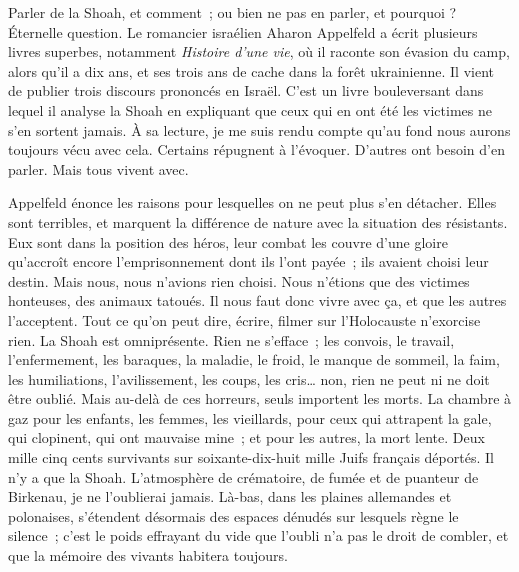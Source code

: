 {Parler de la Shoah, et comment~; ou bien ne pas en parler, et pourquoi
? Éternelle question. Le romancier israélien Aharon Appelfeld a écrit
plusieurs livres superbes, notamment \textit{Histoire d'une vie}, où
il raconte son évasion du camp, alors qu'il a dix ans, et ses trois
ans de cache dans la forêt ukrainienne. Il vient de publier trois
discours prononcés en Israël. C'est un livre bouleversant dans lequel
il analyse la Shoah en expliquant que ceux qui en ont été les
victimes ne s'en sortent jamais. À sa lecture, je me suis rendu
compte qu'au fond nous aurons toujours vécu avec cela. Certains
répugnent à l'évoquer. D'autres ont besoin d'en parler. Mais tous
vivent avec.

Appelfeld énonce les raisons pour lesquelles on ne peut plus s'en
détacher. Elles sont terribles, et marquent la différence de nature
avec la situation des résistants. Eux sont dans la position des
héros, leur combat les couvre d'une gloire qu'accroît encore
l'emprisonnement dont ils l'ont payée~; ils avaient choisi leur
destin. Mais nous, nous n'avions rien choisi. Nous n'étions que des
victimes honteuses, des animaux tatoués. Il nous faut donc vivre avec
ça, et que les autres l'acceptent. Tout ce qu'on peut dire, écrire,
filmer sur l'Holocauste n'exorcise rien. La Shoah est omniprésente.
Rien ne s'efface~; les convois, le travail, l'enfermement, les
baraques, la maladie, le froid, le manque de sommeil, la faim, les
humiliations, l'avilissement, les coups, les cris… non, rien ne peut
ni ne doit être oublié. Mais au-delà de ces horreurs, seuls importent
les morts. La chambre à gaz pour les enfants, les femmes, les
vieillards, pour ceux qui attrapent la gale, qui clopinent, qui ont
mauvaise mine~; et pour les autres, la mort lente. Deux mille cinq
cents survivants sur soixante-dix-huit mille Juifs français déportés.
Il n'y a que la Shoah. L'atmosphère de crématoire, de fumée et de
puanteur de Birkenau, je ne l'oublierai jamais. Là-bas, dans les
plaines allemandes et polonaises, s'étendent désormais des espaces
dénudés sur lesquels règne le silence~; c'est le poids effrayant du
vide que l'oubli n'a pas le droit de combler, et que la mémoire des
vivants habitera toujours.
}

